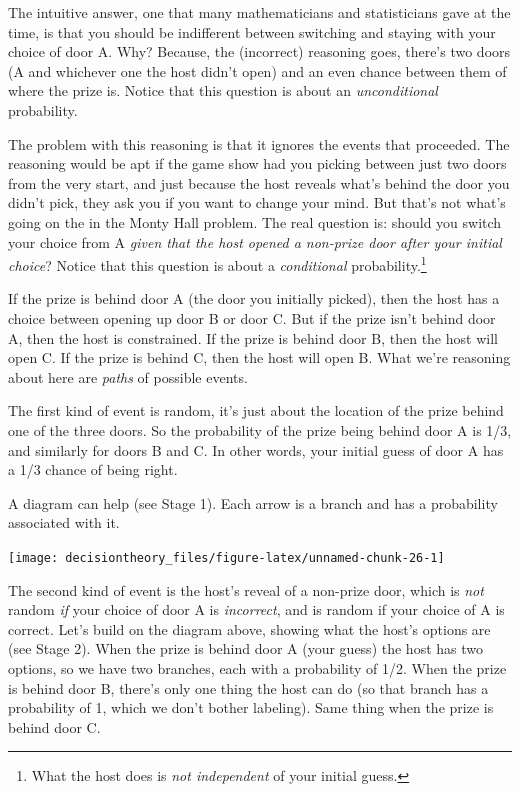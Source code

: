 \documentclass[]{tufte-book}
\begin{document}
The intuitive answer, one that many mathematicians and statisticians gave at the time, is that you should be indifferent between switching and staying with your choice of door A. Why? Because, the (incorrect) reasoning goes, there's two doors (A and whichever one the host didn't open) and an even chance between them of where the prize is. Notice that this question is about an \emph{unconditional} probability.

The problem with this reasoning is that it ignores the events that proceeded. The reasoning would be apt if the game show had you picking between just two doors from the very start, and just because the host reveals what's behind the door you didn't pick, they ask you if you want to change your mind. But that's not what's going on the in the Monty Hall problem. The real question is: should you switch your choice from A \emph{given that the host opened a non-prize door after your initial choice}? Notice that this question is about a \emph{conditional} probability.\footnote{What the host does is \emph{not independent} of your initial guess.}

If the prize is behind door A (the door you initially picked), then the host has a choice between opening up door B or door C. But if the prize isn't behind door A, then the host is constrained. If the prize is behind door B, then the host will open C. If the prize is behind C, then the host will open B. What we're reasoning about here are \emph{paths} of possible events.

The first kind of event is random, it's just about the location of the prize behind one of the three doors. So the probability of the prize being behind door A is 1/3, and similarly for doors B and C. In other words, your initial guess of door A has a 1/3 chance of being right.

A diagram can help (see Stage 1). Each arrow is a branch and has a probability associated with it.

\begin{marginfigure}
\texttt{[image: decisiontheory\_files/figure-latex/unnamed-chunk-26-1]} \caption[Stage 1 of tree diagram]{Stage 1 of tree diagram}\label{fig:unnamed-chunk-26}
\end{marginfigure}

The second kind of event is the host's reveal of a non-prize door, which is \emph{not} random \emph{if} your choice of door A is \emph{incorrect}, and is random if your choice of A is correct. Let's build on the diagram above, showing what the host's options are (see Stage 2). When the prize is behind door A (your guess) the host has two options, so we have two branches, each with a probability of 1/2. When the prize is behind door B, there's only one thing the host can do (so that branch has a probability of 1, which we don't bother labeling). Same thing when the prize is behind door C.
\end{document}
